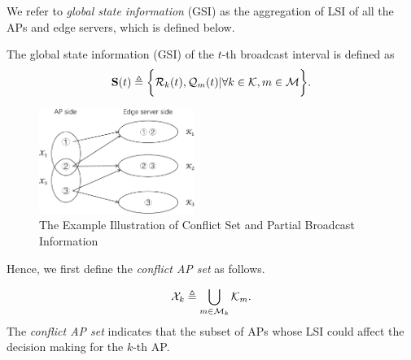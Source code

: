 We refer to \emph{global state information} (GSI) as the aggregation of LSI of all the APs and edge servers, which is defined below.
\begin{definition}
    The global state information (GSI) of the $t$-th broadcast interval is defined as
    \begin{align}
        \mathbf{S}(t) \triangleq
            \bigg\{
                \mathcal{R}_{k}(t), \mathcal{Q}_{m}(t) | \forall k\in\mathcal{K}, m\in\mathcal{M}
            \bigg\}.
    \end{align}
\end{definition}

\begin{figure}[tp]
    \centering
    \includegraphics[width=0.45\textwidth]{images/conflict.pdf}
    \caption{The Example Illustration of Conflict Set and Partial Broadcast Information}
    \label{fig:conflict}
\end{figure}

Hence, we first define the \emph{conflict AP set} as follows.
\begin{definition}
    \begin{align}
        \mathcal{X}_{k} \triangleq \bigcup_{m\in\mathcal{M}_{k}} \mathcal{K}_{m}.
    \end{align}
    The \emph{conflict AP set} indicates that the subset of APs whose LSI could affect the decision making for the $k$-th AP.
\end{definition}

